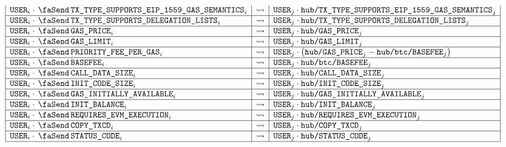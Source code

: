 \begin{description}
\[{\begin{array}{|l|c|l|}
				\user _{i} \cdot \txTypeSupportsEipFifteenFiftyNineGasSemantics _{i} & \rightsquigarrow & \user _{j} \cdot \txnDataHubTransactionTypeSupportsEipFifteenFiftyNineGasSemantics _{j} \\ \hline
				\user _{i} \cdot \txTypeSupportsDelegationLists     _{i} & \rightsquigarrow & \user _{j} \cdot \txnDataHubTransactionTypeSupportsDelegationLists     _{j} \\ \hline
				\user _{i} \cdot \txGasPrice                        _{i} & \rightsquigarrow & \user _{j} \cdot \txnDataHubGasPrice                                   _{j} \\ \hline
				\user _{i} \cdot \txGasLimit                        _{i} & \rightsquigarrow & \user _{j} \cdot \txnDataHubGasLimit                                   _{j} \\ \hline
				\user _{i} \cdot \txPriorityFeePerGas               _{i} & \rightsquigarrow & \user _{j} \cdot \big(\txnDataHubGasPrice                              _{j} -  \txnDataHubBasefee _{j}\big) \\ \hline
				\user _{i} \cdot \txBasefee                         _{i} & \rightsquigarrow & \user _{j} \cdot \txnDataHubBasefee                                    _{j} \\ \hline
				\user _{i} \cdot \txCallDataSize                    _{i} & \rightsquigarrow & \user _{j} \cdot \txnDataHubCallDataSize                               _{j} \\ \hline
				\user _{i} \cdot \txInitCodeSize                    _{i} & \rightsquigarrow & \user _{j} \cdot \txnDataHubInitCodeSize                               _{j} \\ \hline
				\user _{i} \cdot \txInitialGas           _{i} & \rightsquigarrow & \user _{j} \cdot \txnDataHubInitialGas           _{j} \\ \hline
				\user _{i} \cdot \txInitialBalance       _{i} & \rightsquigarrow & \user _{j} \cdot \txnDataHubInitialBalance       _{j} \\ \hline
				\user _{i} \cdot \txRequiresEvmExecution _{i} & \rightsquigarrow & \user _{j} \cdot \txnDataHubRequiresEvmExecution _{j} \\ \hline
				\user _{i} \cdot \txCopyTxcd             _{i} & \rightsquigarrow & \user _{j} \cdot \txnDataHubCopyTxcd             _{j} \\ \hline
				\user _{i} \cdot \txStatusCode         _{i} & \rightsquigarrow & \user _{j} \cdot \txnDataHubStatusCode         _{j} \\ \hline

\end{array}}\]
\end{description}
